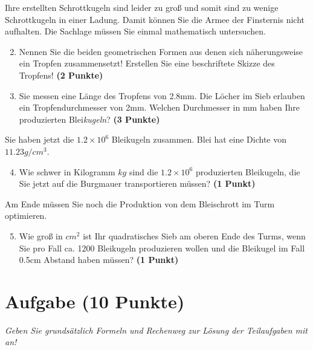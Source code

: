 \documentclass[a4paper, 9pt]{scrartcl}\usepackage[]{graphicx}\usepackage[]{xcolor}
\begin{document}
Ihre erstellten Schrottkugeln sind leider zu gro{\ss} und somit sind zu wenige
Schrottkugeln in einer Ladung. Damit k{\"o}nnen Sie die Armee der Finsternis
nicht aufhalten. Die Sachlage m{\"u}ssen Sie einmal mathematisch untersuchen.

\begin{enumerate}
  \setcounter{enumi}{1}
\item Nennen Sie die beiden geometrischen Formen aus denen sich
  n{\"a}herungsweise ein Tropfen zusammensetzt! Erstellen Sie eine beschriftete 
  Skizze des Tropfens!
  \textbf{(2 Punkte)}
\item Sie messen eine L{\"a}nge des Tropfens von 2.8mm. Die L{\"o}cher
  im Sieb erlauben ein Tropfendurchmesser von 2mm. Welchen
  Durchmesser in mm haben Ihre produzierten Blei\textit{kugeln}?  \textbf{(3 Punkte)}
\end{enumerate}

Sie haben jetzt die \ensuremath{1.2\times 10^{6}} Bleikugeln zusammen. Blei hat eine Dichte
von $11.23g/cm^3$.

\begin{enumerate}
  \setcounter{enumi}{3}
\item Wie schwer in Kilogramm $kg$ sind die \ensuremath{1.2\times 10^{6}} produzierten
  Bleikugeln, die Sie jetzt auf die Burgmauer transportieren m{\"u}ssen?
  \textbf{(1 Punkt)}
\end{enumerate}

Am Ende m{\"u}ssen Sie noch die Produktion von dem Bleischrott im Turm optimieren.

\begin{enumerate}
  \setcounter{enumi}{4}
\item Wie gro{\ss} in $cm^2$ ist Ihr quadratisches Sieb am oberen Ende des Turms,
  wenn Sie pro Fall ca. 1200 Bleikugeln produzieren wollen und
  die Bleikugel im Fall 0.5cm Abstand haben m{\"u}ssen?  \textbf{(1
    Punkt)}
\end{enumerate}
 
\clearpage

\section{Aufgabe \hfill (10 Punkte)}

\textit{Geben Sie grunds{\"a}tzlich Formeln und Rechenweg zur L{\"o}sung der
  Teilaufgaben mit an!} \\[1Ex]
\end{document}
